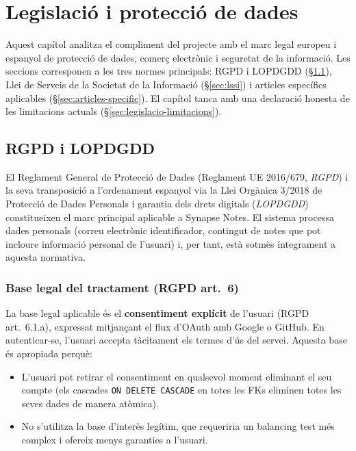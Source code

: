 \chapter{Legislació i protecció de dades}
\label{ch:legislacio}

Aquest capítol analitza el compliment del projecte amb el marc legal europeu i espanyol de protecció de dades, comerç electrònic i seguretat de la informació. Les seccions corresponen a les tres normes principals: RGPD i LOPDGDD (\S\ref{sec:rgpd}), Llei de Serveis de la Societat de la Informació (\S\ref{sec:lssi}) i articles específics aplicables (\S\ref{sec:articles-specific}). El capítol tanca amb una declaració honesta de les limitacions actuals (\S\ref{sec:legislacio-limitacions}).

\section{RGPD i LOPDGDD}
\label{sec:rgpd}

El Reglament General de Protecció de Dades (Reglament UE 2016/679, \emph{RGPD}) i la seva transposició a l'ordenament espanyol via la Llei Orgànica 3/2018 de Protecció de Dades Personals i garantia dels drets digitals (\emph{LOPDGDD}) constitueixen el marc principal aplicable a Synapse Notes. El sistema processa dades personals (correu electrònic identificador, contingut de notes que pot incloure informació personal de l'usuari) i, per tant, està sotmès íntegrament a aquesta normativa.

\subsection{Base legal del tractament (RGPD art.~6)}

La base legal aplicable és el \textbf{consentiment explícit} de l'usuari (RGPD art.~6.1.a), expressat mitjançant el flux d'OAuth amb Google o GitHub. En autenticar-se, l'usuari accepta tàcitament els termes d'ús del servei. Aquesta base és apropiada perquè:

\begin{itemize}
    \item L'usuari pot retirar el consentiment en qualsevol moment eliminant el seu compte (els cascades \texttt{ON DELETE CASCADE} en totes les FKs eliminen totes les seves dades de manera atòmica).
    \item No s'utilitza la base d'interès legítim, que requeriria un balancing test més complex i ofereix menys garanties a l'usuari.
\end{itemize}

